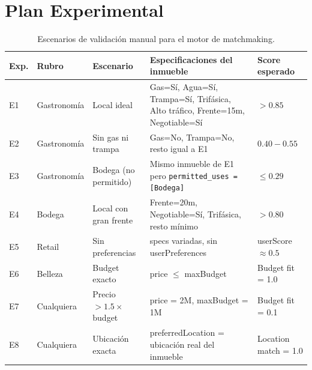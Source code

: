 \documentclass[11pt,a4paper]{article}
\begin{document}
\section{Plan Experimental}
\begin{table}[H]
    \centering
    \renewcommand{\arraystretch}{1.2}
    \begin{tabularx}{\textwidth}{l l l X X}
        \toprule
        \textbf{Exp.} & \textbf{Rubro} & \textbf{Escenario} & \textbf{Especificaciones del inmueble} & \textbf{Score esperado} \\
        \midrule
        E1 & Gastronomía & Local ideal & Gas=Sí, Agua=Sí, Trampa=Sí, Trifásica, Alto tráfico, Frente=15m, Negotiable=Sí & $> 0.85$ \\
        \addlinespace
        E2 & Gastronomía & Sin gas ni trampa & Gas=No, Trampa=No, resto igual a E1 & $0.40 - 0.55$ \\
        \addlinespace
        E3 & Gastronomía & Bodega (no permitido) & Mismo inmueble de E1 pero \texttt{permitted\_uses = [Bodega]} & $\leq 0.29$ \\
        \addlinespace
        E4 & Bodega & Local con gran frente & Frente=20m, Negotiable=Sí, Trifásica, resto mínimo & $> 0.80$ \\
        \addlinespace
        E5 & Retail & Sin preferencias & specs variadas, sin userPreferences & userScore $\approx 0.5$ \\
        \addlinespace
        E6 & Belleza & Budget exacto & price $\leq$ maxBudget & Budget fit = 1.0 \\
        \addlinespace
        E7 & Cualquiera & Precio $> 1.5\times$ budget & price = 2M, maxBudget = 1M & Budget fit = 0.1 \\
        \addlinespace
        E8 & Cualquiera & Ubicación exacta & preferredLocation = ubicación real del inmueble & Location match = 1.0 \\
        \bottomrule
    \end{tabularx}
    \caption{Escenarios de validación manual para el motor de matchmaking.}
\end{table}
\end{document}
